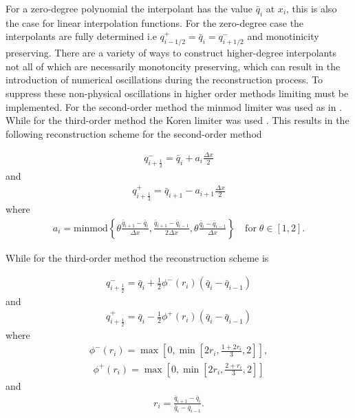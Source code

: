 \documentclass[SingleSpace,12pt,Proceedings]{Serre_ASCE}
\begin{document}
For a zero-degree polynomial the interpolant has the value $\bar{q}_i$ at $x_i$, this is also the case for linear interpolation functions. For the zero-degree case the interpolants are fully determined i.e $q^{+}_{i - 1/2} = \bar{q}_i = q^{-}_{i+ 1/2}$ and monotinicity preserving. There are a variety of ways to construct higher-degree interpolants not all of which are necessarily monotoncity preserving, which can result in the introduction of numerical oscillations during the reconstruction process. To suppress these non-physical oscillations in higher order methods limiting must be implemented. For the second-order method the minmod limiter was used as in . While for the third-order method the Koren limiter was used \cite{Koren-1993}. This results in the following reconstruction scheme for the second-order method
\begin{linenomath*}
\begin{gather*}
q^-_{i + \frac{1}{2}} =  \bar{q}_i + a_i \frac{\Delta x}{2}
\end{gather*}
and
\begin{gather*}
q^+_{i + \frac{1}{2}} =  \bar{q}_{i+1} - a_{i + 1} \frac{\Delta x}{2}
\end{gather*}
where
\begin{gather*}
a_i = \text{minmod}\left\lbrace\theta \frac{\bar{q}_{i+1} - \bar{q}_{i}}{\Delta x}, \frac{\bar{q}_{i+1} - \bar{q}_{i-1}}{2\Delta x} ,\theta \frac{\bar{q}_{i} - \bar{q}_{i-1}}{\Delta x}\right\rbrace \quad \text{for} \; \theta \in \left[1,2\right].
\end{gather*}
\end{linenomath*}
While for the third-order method the reconstruction scheme is
\begin{linenomath*}
\begin{gather*}
q^-_{i + \frac{1}{2}} = \bar{q}_i + \frac{1}{2}\phi^-\left(r_i\right)\left(\bar{q}_i -\bar{q}_{i-1} \right)
\end{gather*}
and
\begin{gather*}
q^+_{i + \frac{1}{2}} = \bar{q}_i - \frac{1}{2}\phi^+\left(r_i\right)\left(\bar{q}_i -\bar{q}_{i-1} \right)
\end{gather*}
where
\begin{gather*}
\phi^-\left(r_i\right) = \max\left[0, \min\left[2 r_i, \frac{1 + 2r_i}{3},2\right]\right],
\end{gather*}
\begin{gather*}
\phi^+\left(r_i\right) = \max\left[0, \min\left[2 r_i, \frac{2 + r_i}{3},2\right]\right]
\end{gather*}
and
\begin{gather*}
r_i = \frac{\bar{q}_{i+1} - \bar{q}_{i} }{\bar{q}_{i} - \bar{q}_{i-1}}.
\end{gather*}
\end{linenomath*}
\end{document}

